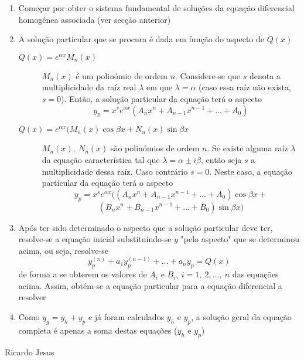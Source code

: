 \documentclass[10pt,landscape]{article}
\begin{document}
\begin{multicols}{3}
\begin{enumerate}
\item Começar por obter o sistema fundamental de soluções da equação diferencial homogénea associada (ver secção anterior)
\item A solução particular que se procura é dada em função do aspecto de $Q(x)$
\begin{description}
\item[$Q(x) = e^{\alpha x} M_n(x)$] $M_n(x)$ é um polinómio de ordem $n$. Considere-se que $s$ denota a multiplicidade da raíz real $\lambda$ em que $\lambda = \alpha$ (caso essa raíz não exista, $s = 0$). Então, a solução particular da equação terá o aspecto
$$y_p = x^s e^{\alpha x} (A_nx^n + A_{n-1}x^{n-1} + ... + A_0)$$
\item[$Q(x) = e^{\alpha x}(M_n(x)\cos{\beta x} + N_n(x)\sin{\beta x}$] $M_n(x),\ N_n(x)$ são polinómios de ordem $n$. Se existe alguma raíz $\lambda$ da equação característica tal que $\lambda = \alpha \pm i\beta$, então seja $s$ a multiplicidade dessa raíz. Caso contrário $s = 0$. Neste caso, a equação particular da equação terá o aspecto
$$y_p = x^s e^{\alpha x}((A_nx^n + A_{n-1}x^{n-1} + ... + A_0)\cos{\beta x} +$$
$$(B_nx^n + B_{n-1}x^{n-1} + ... + B_0)\sin{\beta x})$$
\end{description}
\item Após ter sido determinado o aspecto que a solução particular deve ter, resolve-se a equação inicial substituindo-se $y$ "pelo aspecto" que se determinou acima, ou seja, resolve-se
$$y_p^{(n)} + a_1 y_p^{(n-1)} + ... + a_n y_p = Q(x)$$
de forma a se obterem os valores de $A_i$ e $B_i,\ i = 1,\ 2, ...,\ n$ das equações acima. Assim, obtém-se a equação particular para a equação diferencial a resolver
\item Como $y_g = y_h + y_p$ e já foram calculados $y_h$ e $y_p$, a solução geral da equação completa é apenas a soma destas equações ($y_h$ e $y_p$)
\end{enumerate}

\vfill
\hfill Ricardo Jesus
%

\end{multicols}
\end{document}
